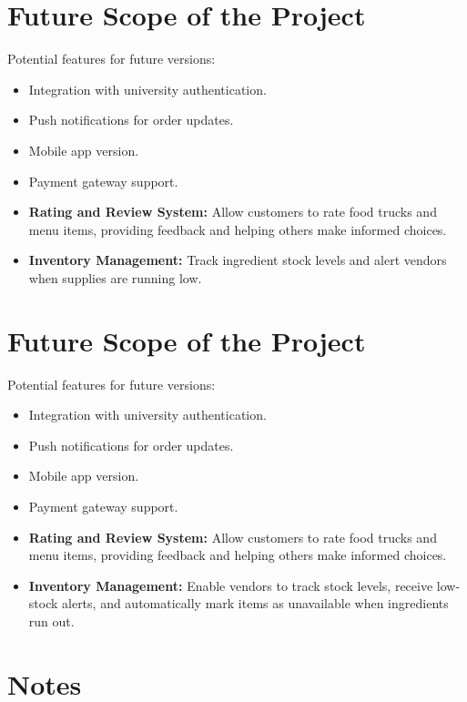 \documentclass[12pt,a4paper]{article}
\begin{document}
\newpage

\section{Future Scope of the Project}
Potential features for future versions:
\begin{itemize}[leftmargin=2em, itemsep=8pt]
    \item Integration with university authentication.
    \item Push notifications for order updates.
    \item Mobile app version.
    \item Payment gateway support.
    \item \textbf{Rating and Review System:} Allow customers to rate food trucks and menu items, providing feedback and helping others make informed choices.
    \item \textbf{Inventory Management:} Track ingredient stock levels and alert vendors when supplies are running low.
\end{itemize}

\newpage

\section{Future Scope of the Project}
Potential features for future versions:
\begin{itemize}[leftmargin=2em, itemsep=8pt]
    \item Integration with university authentication.
    \item Push notifications for order updates.
    \item Mobile app version.
    \item Payment gateway support.
    \item \textbf{Rating and Review System:} Allow customers to rate food trucks and menu items, providing feedback and helping others make informed choices.
    \item \textbf{Inventory Management:} Enable vendors to track stock levels, receive low-stock alerts, and automatically mark items as unavailable when ingredients run out.
\end{itemize}

\newpage

\section*{Notes}
\end{document}

